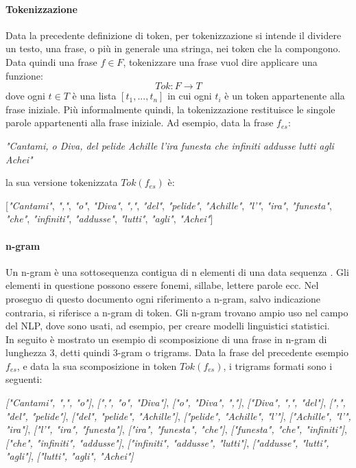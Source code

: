 \paragraph{Tokenizzazione}
Data la precedente definizione di token, per tokenizzazione si intende il dividere un testo, una frase, o più in generale una stringa, nei token che la compongono. Data quindi una frase $f \in F$, tokenizzare una frase vuol dire applicare una funzione:
\begin{equation}
\textit{Tok}: F \rightarrow T
\end{equation}
dove ogni $t \in T$ è una lista $[t_1,...,t_n]$ in cui ogni $t_i$ è un token appartenente alla frase iniziale.
Più informalmente quindi, la tokenizzazione restituisce le singole parole appartenenti alla frase iniziale. Ad esempio, data la frase $f_{es}$:
\begin{center}
\textit{"Cantami, o Diva, del pelide Achille
l'ira funesta che infiniti addusse
lutti agli Achei"}
\end{center}
la sua versione tokenizzata $\textit{Tok}(f_{es})$ è:
\begin{center}
[\textit{"Cantami"},
\textit{","},
\textit{"o"},
\textit{"Diva"},
\textit{","},
\textit{"del"},
\textit{"pelide"},
\textit{"Achille"},
\textit{"l'"},
\textit{"ira"},
\textit{"funesta"},
\textit{"che"},
\textit{"infiniti"},
\textit{"addusse"},
\textit{"lutti"},
\textit{"agli"},
\textit{"Achei"}]
\end{center}

\paragraph{n-gram} Un n-gram è una sottosequenza contigua di n elementi di una data sequenza \cite{itwiki:ngram}. Gli elementi in questione possono essere fonemi, sillabe, lettere parole ecc. Nel proseguo di questo documento ogni riferimento a n-gram, salvo indicazione contraria, si riferisce a n-gram di token. Gli n-gram trovano ampio uso nel campo del NLP, dove sono usati, ad esempio, per creare modelli linguistici statistici.\\
In seguito è mostrato un esempio di scomposizione di una frase in n-gram di lunghezza 3, detti quindi 3-gram o trigrams. Data la frase del precedente esempio $f_{es}$, e data la sua scomposizione in token $\textit{Tok}(f_{es})$, i trigrams formati sono i seguenti:
\begin{center}
\textit{["Cantami", ",", "o"]}, \textit{[",", "o", "Diva"]}, \textit{["o", "Diva", ","]}, \textit{["Diva", ",", "del"]}, \textit{[",", "del", "pelide"]}, \textit{["del", "pelide", "Achille"]}, \textit{["pelide", "Achille", "l'"]}, \textit{["Achille", "l'", "ira"]}, \textit{["l'", "ira", "funesta"]}, \textit{["ira", "funesta", "che"]}, \textit{["funesta", "che", "infiniti"]}, \textit{["che", "infiniti", "addusse"]}, \textit{["infiniti", "addusse", "lutti"]}, \textit{["addusse", "lutti", "agli"]}, \textit{["lutti", "agli", "Achei"]}
\end{center}


